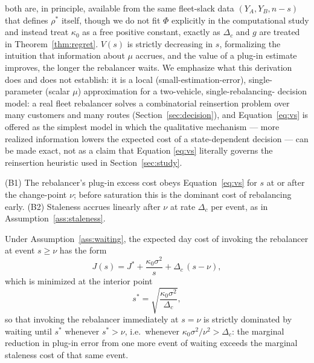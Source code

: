 \documentclass[trsc,dblanonrev]{informs4}
\begin{document}
both are, in principle, available from the same fleet-slack data
$(Y_A, Y_B, n-s)$ that defines $\rho^\ast$ itself, though we do not fit
$\Phi$ explicitly in the computational study and instead treat
$\kappa_0$ as a free positive constant, exactly as $\Delta_c$ and $g$
are treated in Theorem~\ref{thm:regret}. $V(s)$ is strictly decreasing
in $s$, formalizing the intuition that information about $\mu$
accrues, and the value of a plug-in estimate improves, the longer the
rebalancer waits. We emphasize what this derivation does and does not
establish: it is a local (small-estimation-error), single-parameter
(scalar $\mu$) approximation for a two-vehicle, single-rebalancing-
decision model: a real fleet rebalancer solves a combinatorial
reinsertion problem over many customers and many routes
(Section~\ref{sec:decision}), and Equation~\eqref{eq:vs} is offered as
the simplest model in which the qualitative mechanism --- more
realized information lowers the expected cost of a state-dependent
decision --- can be made exact, not as a claim that Equation
\eqref{eq:vs} literally governs the reinsertion heuristic used in
Section~\ref{sec:study}.

\begin{assumption}\label{ass:waiting}
(B1) The rebalancer's plug-in excess cost obeys Equation~\eqref{eq:vs}
for $s$ at or after the change-point $\nu$; before saturation this is
the dominant cost of rebalancing early. (B2) Staleness accrues linearly
after $\nu$ at rate $\Delta_c$ per event, as in
Assumption~\ref{ass:staleness}.
\end{assumption}

\begin{theorem}\label{thm:waiting}
Under Assumption~\ref{ass:waiting}, the expected day cost of invoking
the rebalancer at event $s \ge \nu$ has the form
\begin{equation}\label{eq:js}
J(s) = J^\ast + \frac{\kappa_0\sigma^2}{s} + \Delta_c\,(s - \nu),
\end{equation}
which is minimized at the interior point
\begin{equation}\label{eq:sstar}
s^\ast = \sqrt{\frac{\kappa_0\sigma^2}{\Delta_c}},
\end{equation}
so that invoking the rebalancer immediately at $s = \nu$ is strictly
dominated by waiting until $s^\ast$ whenever $s^\ast > \nu$, i.e.\
whenever $\kappa_0\sigma^2/\nu^2 > \Delta_c$: the marginal reduction in
plug-in error from one more event of waiting exceeds the marginal
staleness cost of that same event.
\end{theorem}
\end{document}
